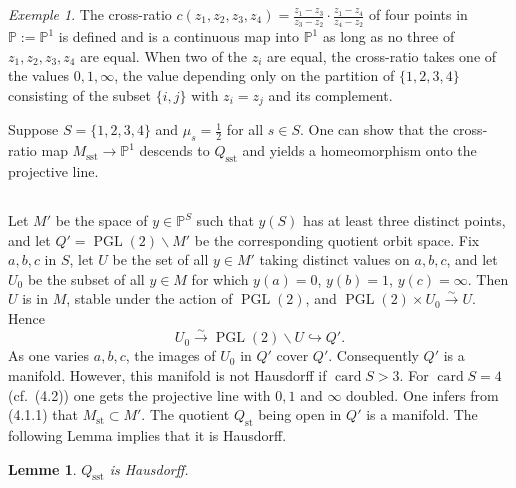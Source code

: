 \documentclass[12pt,a4paper]{article}
\theoremstyle{plain}
\newtheorem{lemma}[theorem]{Lemme}
\theoremstyle{definition}
\theoremstyle{remark}
\newtheorem{example}[theorem]{Exemple}
\DeclareMathOperator{\card}{card}
\DeclareMathOperator{\PGL}{PGL}
\newcommand{\PP}{\mathbb{P}}
\numberwithin{equation}{section}
\providecommand{\PP}{\mathbb{P}}
\providecommand{\PGL}{\operatorname{PGL}}
\begin{document}
\begin{example}\label{ex:4.2}
The cross-ratio $c(z_1, z_2, z_3, z_4) = \frac{z_1 - z_3}{z_3 - z_2} \cdot \frac{z_1 - z_4}{z_4 - z_2}$ of four points in $\PP := \PP^1$ is defined and is a continuous map into $\PP^1$ as long as no three of $z_1, z_2, z_3, z_4$ are equal. When two of the $z_i$ are equal, the cross-ratio takes one of the values $0, 1, \infty$, the value depending only on the partition of $\{1, 2, 3, 4\}$ consisting of the subset $\{i, j\}$ with $z_i = z_j$ and its complement.

Suppose $S = \{1, 2, 3, 4\}$ and $\mu_s = \frac{1}{2}$ for all $s \in S$. One can show that the cross-ratio map $M_{\mathrm{sst}} \to \PP^1$ descends to $Q_{\mathrm{sst}}$ and yields a homeomorphism onto the projective line.
\end{example}

\subsection{}
Let $M'$ be the space of $y \in \PP^S$ such that $y(S)$ has at least three distinct points, and let $Q' = \PGL(2) \backslash M'$ be the corresponding quotient orbit space. Fix $a, b, c$ in $S$, let $U$ be the set of all $y \in M'$ taking distinct values on $a, b, c$, and let $U_0$ be the subset of all $y \in M$ for which $y(a) = 0$, $y(b) = 1$, $y(c) = \infty$. Then $U$ is in $M$, stable under the action of $\PGL(2)$, and $\PGL(2) \times U_0 \xrightarrow{\sim} U$. Hence
\[
U_0 \xrightarrow{\sim} \PGL(2) \backslash U \hookrightarrow Q'.
\]
As one varies $a, b, c$, the images of $U_0$ in $Q'$ cover $Q'$. Consequently $Q'$ is a manifold. However, this manifold is not Hausdorff if $\card S > 3$. For $\card S = 4$ (cf.\ (4.2)) one gets the projective line with $0, 1$ and $\infty$ doubled. One infers from (4.1.1) that $M_{\mathrm{st}} \subset M'$. The quotient $Q_{\mathrm{st}}$ being open in $Q'$ is a manifold. The following Lemma implies that it is Hausdorff.

\begin{lemma}\label{lem:4.3}
$Q_{\mathrm{sst}}$ is Hausdorff.
\end{lemma}
\end{document}
